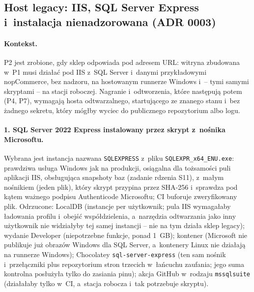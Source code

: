 
\subsection{Host legacy: IIS, SQL Server Express i~instalacja nienadzorowana (ADR 0003)}\label{sec:bench-host}

\paragraph{Kontekst.} P2 jest zrobione, gdy sklep odpowiada pod adresem URL: witryna
zbudowana w~P1 musi działać pod IIS z~SQL Server i~danymi przykładowymi nopCommerce,
bez nadzoru, na hostowanym runnerze Windows i~-- tymi samymi skryptami -- na stacji
roboczej. Nagranie i~odtworzenia, które następują potem (P4, P7), wymagają hosta
odtwarzalnego, startującego ze znanego stanu i~bez żadnego sekretu, który mógłby wyciec
do publicznego repozytorium albo logu.

\paragraph{1. SQL Server 2022 Express instalowany przez skrypt z~nośnika Microsoftu.}
Wybrana jest instancja nazwana \texttt{SQLEXPRESS} z~pliku \texttt{SQLEXPR\_x64\_ENU.exe}:
prawdziwa usługa Windows jak na produkcji, osiągalna dla tożsamości puli aplikacji IIS,
obsługująca snapshoty baz (zadanie rdzenia S11), z~małym nośnikiem (jeden plik), który
skrypt przypina przez SHA-256 i~sprawdza pod kątem ważnego podpisu Authenticode
Microsoftu; CI buforuje zweryfikowany plik. Odrzucone: LocalDB (instancje per użytkownik;
pula IIS wymagałaby ładowania profilu i~obejść współdzielenia, a~narzędzia odtwarzania
jako inny użytkownik nie widziałyby tej samej instancji -- nie na tym działa sklep legacy);
wydanie Developer (niepotrzebne funkcje, ponad 1~GB); kontener (Microsoft nie publikuje już
obrazów Windows dla SQL Server, a~kontenery Linux nie działają na runnerze Windows);
Chocolatey \texttt{sql-server-express} (ten sam nośnik i~przełączniki plus repozytorium
stron trzecich w~łańcuchu zaufania; jego suma kontrolna posłużyła tylko do zasiania pinu);
akcja GitHub w~rodzaju \texttt{mssqlsuite} (działałaby tylko w~CI, a~stacja robocza
i~tak potrzebuje skryptu).

